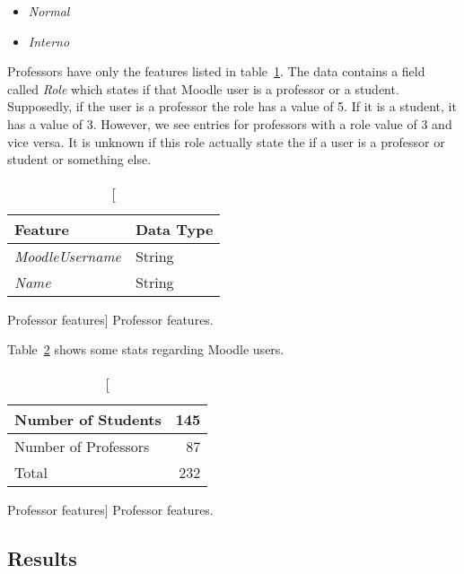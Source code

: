 \begin{itemize}
    \item \textit{Normal}
    \item \textit{Interno}
\end{itemize}

Professors have only the features listed in table~\ref{tab:professor_features}.
The data contains a field called \textit{Role} which states if that Moodle user
is a professor or a student. Supposedly, if the user is a professor the role
has a value of 5. If it is a student, it has a value of 3. However, we see
entries for professors with a role value of 3 and vice versa. It is unknown if
this role actually state the if a user is a professor or student or something
else.

\begin{table}[h!]
    \centering

    \begin{tabular}{l l}
        Feature                 & Data Type \\ \hline
        \textit{MoodleUsername} & String    \\
        \textit{Name}           & String    \\
    \end{tabular}

    \caption
        [Professor features]
        {Professor features.}

    \label{tab:professor_features}
\end{table}

Table~\ref{tab:moodle_users_stats} shows some stats regarding Moodle users.

\begin{table}[h!]
    \centering

    \begin{tabular}{| l | r |}
        \hline
        Number of Students   & 145 \\ \hline
        Number of Professors & 87  \\ \hline
        Total                & 232 \\ \hline
    \end{tabular}

    \caption
        [Professor features]
        {Professor features.}

    \label{tab:moodle_users_stats}
\end{table}

\subsection{Results}

